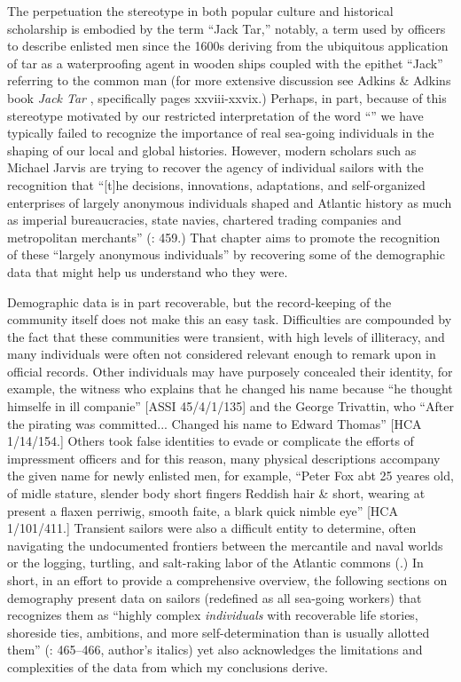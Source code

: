   The perpetuation the  stereotype in both popular culture and historical scholarship is embodied by the term “Jack Tar,” notably, a term used by officers to describe enlisted men since the 1600s deriving from the ubiquitous application of tar as a waterproofing agent in wooden ships coupled with the epithet “Jack” referring to the common man (for more extensive discussion see Adkins \& Adkins book \textit{Jack Tar} \citeyear*{AdkinsAdkins2008}, specifically pages xxviii-xxvix.) Perhaps, in part, because of this stereotype motivated by our restricted interpretation of the word “” we have typically failed to recognize the importance of real sea-going individuals in the shaping of our local and global histories. However, modern scholars such as Michael Jarvis are trying to recover the agency of individual sailors with the recognition that “[t]he decisions, innovations, adaptations, and self-organized enterprises of largely anonymous individuals shaped  and Atlantic history as much as imperial bureaucracies, state navies, chartered trading companies and metropolitan merchants” (\citealt{Jarvis2010}: 459.) That chapter aims to promote the recognition of these “largely anonymous individuals” by recovering some of the demographic data that might help us understand who they were. 

Demographic data is in part recoverable, but the record-keeping of the community itself does not make this an easy task. Difficulties are compounded by the fact that these communities were transient, with high levels of illiteracy, and many individuals were often not considered relevant enough to remark upon in official records. Other individuals may have purposely concealed their identity, for example, the witness who explains that he changed his name because “he thought himselfe in ill companie” [ASSI 45/4/1/135] and the  George Trivattin, who “After the pirating was committed... Changed his name to Edward Thomas” [HCA 1/14/154.] Others took false identities to evade or complicate the efforts of impressment officers and for this reason, many physical descriptions accompany the given name for newly enlisted men, for example, “Peter Fox abt 25 yeares old, of midle stature, slender body short fingers Reddish hair \& short, wearing at present a flaxen perriwig, smooth faite, a blark quick nimble eye” [HCA 1/101/411.] Transient sailors were also a difficult entity to determine, often navigating the undocumented frontiers between the mercantile and naval worlds \citep{Fusaro2015} or the logging, turtling, and salt-raking labor of the Atlantic commons (\citealt{Jarvis2010}.) In short, in an effort to provide a comprehensive overview, the following sections on demography present data on sailors (redefined as all sea-going workers) that recognizes them as “highly complex \textit{individuals} with recoverable life stories, shoreside ties, ambitions, and more self-determination than is usually allotted them” (\citealt{Jarvis2010}: 465--466, author’s italics) yet also acknowledges the limitations and complexities of the data from which my conclusions derive. 

